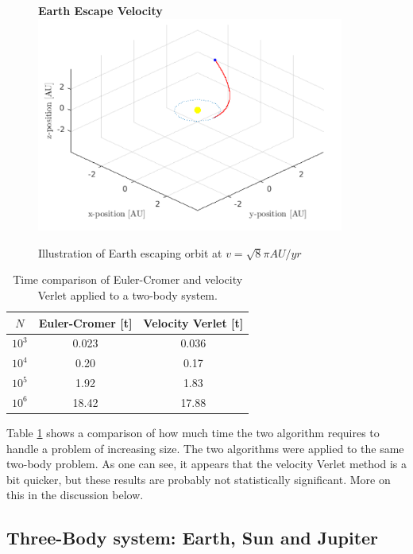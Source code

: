\documentclass[10pt,a4paper]{amsart}
\begin{document}
\begin{figure}
	\centering
	\textbf{Earth Escape Velocity}
	\includegraphics[width=0.9\textwidth]{../figures/earthescape.png}
	\caption{Illustration of Earth escaping orbit at $v=\sqrt{8}\pi AU/yr$\label{fig:earthescape}}
\end{figure}

\begin{table}
	\centering
	\caption{Time comparison of Euler-Cromer and velocity Verlet applied to a two-body system. \label{tab:eulervsverlet}}
	\begin{tabular}{ccc} \hline
	$N$ & Euler-Cromer [t] & Velocity Verlet [t] \\ \hline
	$10^{3}$ & 0.023 & 0.036   \\
	$10^{4}$ & 0.20  & 0.17   \\
	$10^{5}$ & 1.92  & 1.83   \\
	$10^{6}$ & 18.42 & 17.88 \\ \hline
	\end{tabular}
\end{table}

Table \ref{tab:eulervsverlet} shows a comparison of how much time the two algorithm requires to handle a problem of increasing size. The two algorithms were applied to the same two-body problem. As one can see, it appears that the velocity Verlet method is a bit quicker, but these results are probably not statistically significant. More on this in the discussion below.

\subsection{Three-Body system: Earth, Sun and Jupiter}
\end{document}

